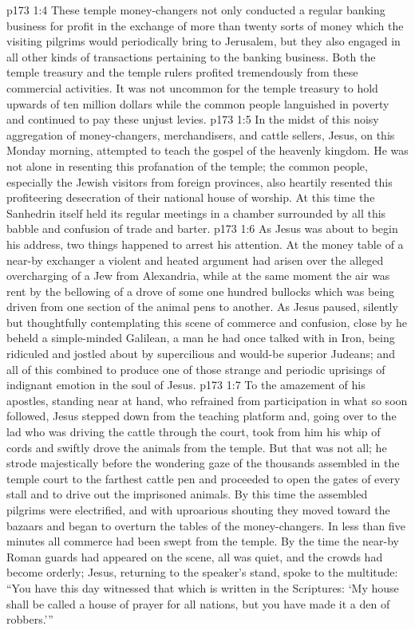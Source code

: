 \vs p173 1:4 These temple money\hyp{}changers not only conducted a regular banking business for profit in the exchange of more than twenty sorts of money which the visiting pilgrims would periodically bring to Jerusalem, but they also engaged in all other kinds of transactions pertaining to the banking business. Both the temple treasury and the temple rulers profited tremendously from these commercial activities. It was not uncommon for the temple treasury to hold upwards of ten million dollars while the common people languished in poverty and continued to pay these unjust levies.
\pc \vs p173 1:5 In the midst of this noisy aggregation of money\hyp{}changers, merchandisers, and cattle sellers, Jesus, on this Monday morning, attempted to teach the gospel of the heavenly kingdom. He was not alone in resenting this profanation of the temple; the common people, especially the Jewish visitors from foreign provinces, also heartily resented this profiteering desecration of their national house of worship. At this time the Sanhedrin itself held its regular meetings in a chamber surrounded by all this babble and confusion of trade and barter.
\vs p173 1:6 As Jesus was about to begin his address, two things happened to arrest his attention. At the money table of a near\hyp{}by exchanger a violent and heated argument had arisen over the alleged overcharging of a Jew from Alexandria, while at the same moment the air was rent by the bellowing of a drove of some one hundred bullocks which was being driven from one section of the animal pens to another. As Jesus paused, silently but thoughtfully contemplating this scene of commerce and confusion, close by he beheld a simple\hyp{}minded Galilean, a man he had once talked with in Iron, being ridiculed and jostled about by supercilious and would\hyp{}be superior Judeans; and all of this combined to produce one of those strange and periodic uprisings of indignant emotion in the soul of Jesus.
\vs p173 1:7 To the amazement of his apostles, standing near at hand, who refrained from participation in what so soon followed, Jesus stepped down from the teaching platform and, going over to the lad who was driving the cattle through the court, took from him his whip of cords and swiftly drove the animals from the temple. But that was not all; he strode majestically before the wondering gaze of the thousands assembled in the temple court to the farthest cattle pen and proceeded to open the gates of every stall and to drive out the imprisoned animals. By this time the assembled pilgrims were electrified, and with uproarious shouting they moved toward the bazaars and began to overturn the tables of the money\hyp{}changers. In less than five minutes all commerce had been swept from the temple. By the time the near\hyp{}by Roman guards had appeared on the scene, all was quiet, and the crowds had become orderly; Jesus, returning to the speaker’s stand, spoke to the multitude: \textcolor{ubdarkred}{“You have this day witnessed that which is written in the Scriptures: ‘My house shall be called a house of prayer for all nations, but you have made it a den of robbers.’”}
